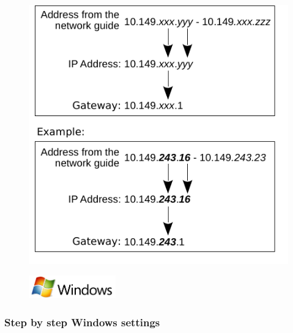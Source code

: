 \documentclass[a4paper,12pt]{scrartcl}
\begin{document}
\begin{figure}[h!]
        \centering
        \begin{minipage}[c]{0.45\linewidth}
          \centering
          \includegraphics[width=\linewidth,keepaspectratio]{Bilder/IP_Gerneric_EN_mb}
        \end{minipage}
\end{figure}


\clearpage
\enlargethispage{20pt}

\begin{figure}[h]
    \raggedleft
    \vspace{-20pt}
    \includegraphics[height=1cm,keepaspectratio]{Bilder/Windows_logo}
    \vspace{-30pt}
\end{figure}

\subsubsection*{Step by step Windows settings}
\end{document}
